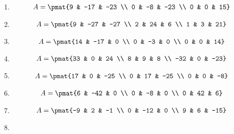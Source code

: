 \begin{enumerate}
\item

\begin{align*}
A = \pmat{9 & -17 & -23 \\ 0 & -8 & -23 \\ 0 & 0 & 15}
\end{align*}

\item

\begin{align*}
A = \pmat{9 & -27 & -27 \\ 2 & 24 & 6 \\ 1 & 3 & 21}
\end{align*}

\item

\begin{align*}
A = \pmat{14 & -17 & 0 \\ 0 & -3 & 0 \\ 0 & 0 & 14}
\end{align*}

\item

\begin{align*}
A = \pmat{33 & 0 & 24 \\ 8 & 9 & 8 \\ -32 & 0 & -23}
\end{align*}

\item

\begin{align*}
A = \pmat{17 & 0 & -25 \\ 0 & 17 & -25 \\ 0 & 0 & -8}
\end{align*}

\item

\begin{align*}
A = \pmat{6 & -42 & 0 \\ 0 & -8 & 0 \\ 0 & 42 & 6}
\end{align*}

\item

\begin{align*}
A = \pmat{-9 & 2 & -1 \\ 0 & -12 & 0 \\ 9 & 6 & -15}
\end{align*}

\item


\end{enumerate}
